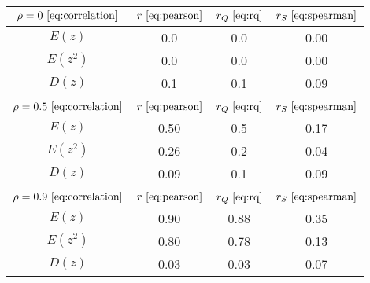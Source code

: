 \begin{tabular}{|c|c|c|c|}
\hline
$\rho = 0~\eqref{eq:correlation}$ & $r ~\eqref{eq:pearson}$ & $r_Q ~\eqref{eq:rq}$ & $r_S ~\eqref{eq:spearman}$\\
\hline
$E(z)$ & 0.0 & 0.0 & 0.00\\
\hline
$E(z^2)$ & 0.0 & 0.0 & 0.00\\
\hline
$D(z)$ & 0.1 & 0.1 & 0.09\\
\hline
 &  &  & \\
\hline
$\rho = 0.5~\eqref{eq:correlation}$ & $r ~\eqref{eq:pearson}$ & $r_Q ~\eqref{eq:rq}$ & $r_S ~\eqref{eq:spearman}$\\
\hline
$E(z)$ & 0.50 & 0.5 & 0.17\\
\hline
$E(z^2)$ & 0.26 & 0.2 & 0.04\\
\hline
$D(z)$ & 0.09 & 0.1 & 0.09\\
\hline
 &  &  & \\
\hline
$\rho = 0.9~\eqref{eq:correlation}$ & $r ~\eqref{eq:pearson}$ & $r_Q ~\eqref{eq:rq}$ & $r_S ~\eqref{eq:spearman}$\\
\hline
$E(z)$ & 0.90 & 0.88 & 0.35\\
\hline
$E(z^2)$ & 0.80 & 0.78 & 0.13\\
\hline
$D(z)$ & 0.03 & 0.03 & 0.07\\
\hline
\end{tabular}

